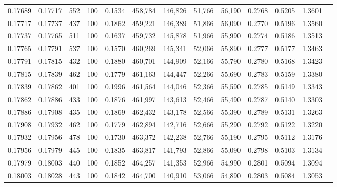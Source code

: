 \begin{tabular}{rrrrrrrrrrrrr}
0.17689 & 0.17717 &   552 & 100 &                                     0.1534 & 458,784 & 146,826 &  51,766 &  56,190 & 0.2768 & 0.5205 & 1.3601 \\
0.17717 & 0.17737 &   437 & 100 &                                     0.1862 & 459,221 & 146,389 &  51,866 &  56,090 & 0.2770 & 0.5196 & 1.3560 \\
0.17737 & 0.17765 &   511 & 100 &                                     0.1637 & 459,732 & 145,878 &  51,966 &  55,990 & 0.2774 & 0.5186 & 1.3513 \\
0.17765 & 0.17791 &   537 & 100 &                                     0.1570 & 460,269 & 145,341 &  52,066 &  55,890 & 0.2777 & 0.5177 & 1.3463 \\
0.17791 & 0.17815 &   432 & 100 &                                     0.1880 & 460,701 & 144,909 &  52,166 &  55,790 & 0.2780 & 0.5168 & 1.3423 \\
0.17815 & 0.17839 &   462 & 100 &                                     0.1779 & 461,163 & 144,447 &  52,266 &  55,690 & 0.2783 & 0.5159 & 1.3380 \\
0.17839 & 0.17862 &   401 & 100 &                                     0.1996 & 461,564 & 144,046 &  52,366 &  55,590 & 0.2785 & 0.5149 & 1.3343 \\
0.17862 & 0.17886 &   433 & 100 &                                     0.1876 & 461,997 & 143,613 &  52,466 &  55,490 & 0.2787 & 0.5140 & 1.3303 \\
0.17886 & 0.17908 &   435 & 100 &                                     0.1869 & 462,432 & 143,178 &  52,566 &  55,390 & 0.2789 & 0.5131 & 1.3263 \\
0.17908 & 0.17932 &   462 & 100 &                                     0.1779 & 462,894 & 142,716 &  52,666 &  55,290 & 0.2792 & 0.5122 & 1.3220 \\
0.17932 & 0.17956 &   478 & 100 &                                     0.1730 & 463,372 & 142,238 &  52,766 &  55,190 & 0.2795 & 0.5112 & 1.3176 \\
0.17956 & 0.17979 &   445 & 100 &                                     0.1835 & 463,817 & 141,793 &  52,866 &  55,090 & 0.2798 & 0.5103 & 1.3134 \\
0.17979 & 0.18003 &   440 & 100 &                                     0.1852 & 464,257 & 141,353 &  52,966 &  54,990 & 0.2801 & 0.5094 & 1.3094 \\
0.18003 & 0.18028 &   443 & 100 &                                     0.1842 & 464,700 & 140,910 &  53,066 &  54,890 & 0.2803 & 0.5084 & 1.3053 \\

\end{tabular}
